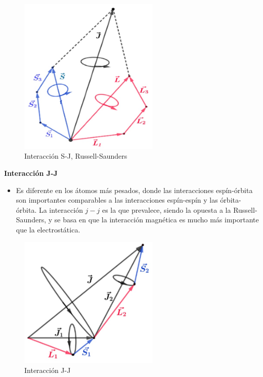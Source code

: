 \begin{figure}[H]
    \centering
    \includegraphics[width=0.6\textwidth]{./Figures/GraficoCaso1}
	\caption{Interacción S-J, Russell-Saunders}
	\label{fig:GraficoCaso1}
\end{figure}

\textbf{Interacción J-J}
\begin{itemize}
	\item Es diferente en los átomos más pesados, donde las interacciones espín-órbita son importantes comparables a las interacciones espín-espín y las órbita-órbita. La interacción $j-j$ es la que prevalece, siendo la opuesta a la Russell-Saunders, y se basa en que la interacción magnética es mucho más importante que la electrostática.
\end{itemize}
 
\begin{figure}[H]
    \centering
    \includegraphics[width=0.6\textwidth]{./Figures/GraficoCaso2}
	\caption{Interacción J-J}
	\label{fig:GraficoCaso2}
\end{figure}

